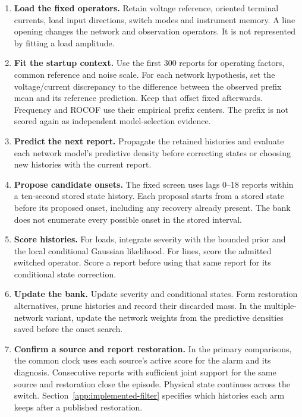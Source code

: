 \begin{enumerate}
\item \textbf{Load the fixed operators.} Retain voltage reference,
oriented terminal currents, load input directions, switch modes and
instrument memory. A line opening changes the network and observation
operators. It is not represented by fitting a load amplitude.
\item \textbf{Fit the startup context.} Use the first 300 reports for
operating factors, common reference and noise scale. For each network
hypothesis, set the voltage/current discrepancy to the difference between
the observed prefix mean and its reference prediction. Keep that offset
fixed afterwards. Frequency and ROCOF use their empirical prefix centers.
The prefix is not scored again as independent model-selection evidence.
\item \textbf{Predict the next report.} Propagate the retained histories
and evaluate each network model's predictive density before correcting
states or choosing new histories with the current report.
\item \textbf{Propose candidate onsets.} The fixed screen uses lags
0--18 reports within a ten-second stored state history. Each proposal
starts from a stored state before its proposed onset, including any
recovery already present. The bank does not enumerate every possible
onset in the stored interval.
\item \textbf{Score histories.} For loads, integrate severity with the
bounded prior and the local conditional Gaussian likelihood. For lines,
score the admitted switched operator. Score a report before using that
same report for its conditional state correction.
\item \textbf{Update the bank.} Update severity and conditional states.
Form restoration alternatives, prune histories and record their discarded
mass. In the multiple-network variant, update the network weights from
the predictive densities saved before the onset search.
\item \textbf{Confirm a source and report restoration.} In the primary
comparisons, the common clock uses each source's active score for the alarm
and its diagnosis. Consecutive reports with sufficient joint support for
the same source and restoration close the episode. Physical state continues
across the switch. Section~\ref{app:implemented-filter} specifies which
histories each arm keeps after a published restoration.
\end{enumerate}

